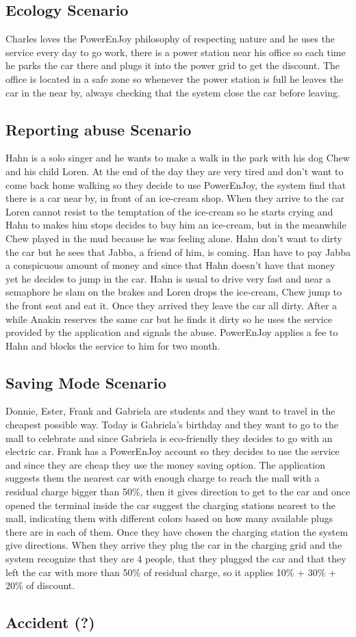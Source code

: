 \subsection{Ecology Scenario}
Charles loves the PowerEnJoy philosophy of respecting nature and he uses the service every day to go work, there is a power station near his office so each time he parks the car there and plugs it into the power grid to get the discount. 
The office is located in a safe zone so whenever the power station is full he leaves the car in the near by, always checking that the system close the car before leaving.

\subsection{Reporting abuse Scenario}
Hahn is a solo singer and he wants to make a walk in the park with his dog Chew and his child Loren. At the end of the day they are very tired and don't want to come back home walking so they decide to use PowerEnJoy, the system find that there is a car near by, in front of an ice-cream shop. When they arrive to the car Loren cannot resist to the temptation of the ice-cream so he starts crying and Hahn to makes him stops decides to buy him an ice-cream, but in the meanwhile Chew played in the mud because he was feeling alone. Hahn don't want to dirty the car but he sees that Jabba, a friend of him, is coming. Han have to pay Jabba a conspicuous amount of money and since that Hahn doesn't have that money yet he decides to jump in the car. Hahn is usual to drive very fast and near a semaphore he slam on the brakes and Loren drops the ice-cream, Chew jump to the front seat and eat it. Once they arrived they leave the car all dirty. After a while Anakin reserves the same car but he finds it dirty so he uses the service provided by the application and signals the abuse. PowerEnJoy applies a fee to Hahn and blocks the service to him for two month.

\subsection{Saving Mode Scenario}
Donnie, Ester, Frank and Gabriela are students and they want to travel in the cheapest possible way. Today is Gabriela's birthday and they want to go to the mall to celebrate and since Gabriela is eco-friendly they decides to go with an electric car. Frank has a PowerEnJoy account so they decides to use the service and since they are cheap they use the money saving option. The application suggests them the nearest car with enough charge to reach the mall with a residual charge bigger than 50\%, then it gives direction to get to the car and once opened the terminal inside the car suggest the charging stations nearest to the mall, indicating them with different colors based on how many available plugs there are in each of them. Once they have chosen the charging station the system give directions. When they arrive  they plug the car in the charging grid and the system recognize that they are 4 people, that they plugged the car and that they left the car with more than 50\% of residual charge, so it applies 10\% + 30\% + 20\% of discount.

\subsection{Accident (?)}


